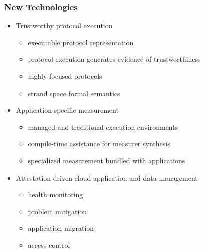 \documentclass{beamer}
\begin{document}
\begin{frame}
  \frametitle{New Technologies}
  \begin{itemize}
  \item Trustworthy protocol execution
    \begin{itemize}
    \item executable protocol representation
    \item protocol execution generates evidence of trustworthiness
    \item highly focused protocols
    \item strand space formal semantics
    \end{itemize}
  \item Application specific measurement
    \begin{itemize}
    \item managed and traditional execution environments
    \item compile-time assistance for measurer synthesis
    \item specialized measurement bundled with applications
    \end{itemize}
  \item Attestation driven cloud application and data management
    \begin{itemize}
    \item health monitoring
    \item problem mitigation
    \item application migration
    \item access control
    \end{itemize}
  \end{itemize}
\end{frame}
\end{document}

